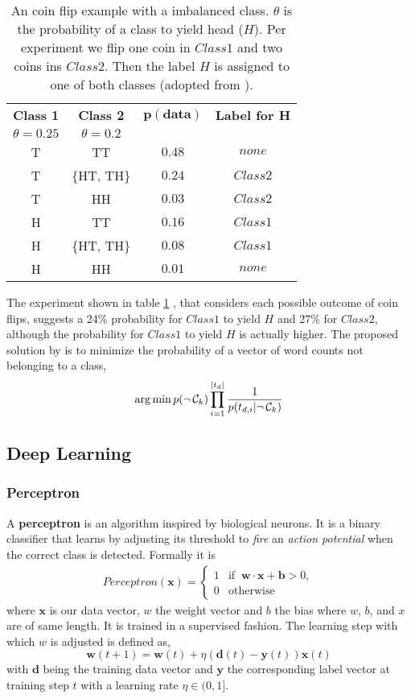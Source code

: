 \begin{table}[h!]
  \centering
  \caption{An coin flip example with a imbalanced class. $\theta$ is the probability of a class to yield head ($H$). Per experiment we flip one coin in $Class 1$ and two coins ins $Class 2.$ Then the label $H$ is assigned to one of both classes (adopted from \cite{Rennie2003}).}
  \setlength{\tabcolsep}{1.5em}
  \begin{tabular}{@{}cccc@{}}
    \toprule
    \textbf{Class 1} & \textbf{Class 2} & $\mathbf{p(data)}$ & \textbf{Label for H} \\
    $\theta = 0.25$ & $\theta=0.2$ & & \\
    \midrule
    T & TT & $0.48$ & $none$ \\
    T & \{HT, TH\} & $0.24$ & $Class 2$ \\
    T & HH & $0.03$ & $Class 2$ \\
    H & TT & $0.16$ & $Class 1$ \\
    H & \{HT, TH\} & $0.08$ & $Class 1$ \\
    H & HH & $0.01$ & $none$ \\
    \bottomrule
  \end{tabular}
  \label{table:coinflip}
\end{table}
The experiment shown in table \ref{table:coinflip} , that considers each possible outcome of coin flips, suggests a 24\% probability for $Class 1$ to yield $H$ and 27\% for $Class 2$, although the probability for $Class 1$ to yield $H$ is actually higher.
The proposed solution by \cite{Rennie2003} is to minimize the probability of a vector of word counts not belonging to a class,
\[\operatorname*{arg\,min} p(\neg\, \mathcal{C}_k) \prod_{i=1}^{|t_{d}|} \frac{1}{p(t_{d,i}|\neg\, \mathcal{C}_k)} \]

\subsection{Deep Learning}

\subsubsection{Perceptron}
A \textbf{perceptron} is an algorithm inspired by biological neurons. It is a binary classifier that learns by adjusting its threshold to \textsl{fire} an \textsl{action potential} when the correct class is detected. Formally it is
\begin{gather}
  Perceptron(\mathbf{x}) = \begin{cases}1 & \text{if }\ \mathbf{w} \cdot \mathbf{x} + \mathbf{b} > 0,\\
  0 & \text{otherwise}\end{cases}
\end{gather}
where $\mathbf{x}$ is our data vector, $w$ the weight vector and $b$ the bias where $w$, $b$, and $x$ are of same length. It is trained in a supervised fashion. The learning step with which $w$ is adjusted is defined as,
\[\mathbf{w}(t+1) = \mathbf{w}(t) + \eta (\mathbf{d}(t) - \mathbf{y}(t))\mathbf{x}(t)\]
with $\mathbf{d}$ being the training data vector and $\mathbf{y}$ the corresponding label vector at training step $t$ with a learning rate $\eta \in (0,1]$.


